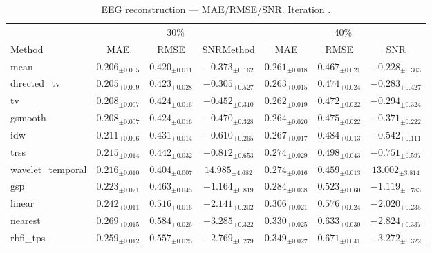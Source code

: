 ﻿%
\begin{table}[ht]
\centering
\caption[EEG reconstruction - Iteration it08]{EEG reconstruction — MAE/RMSE/SNR. Iteration .}
\label{tab:main_it08_high_missing_synthetic}
\small
\begin{tabular}{lcccccc}
\toprule
\multicolumn{1}{c}{} & \multicolumn{3}{c}{30\%} & \multicolumn{3}{c}{40\%} \\
\cmidrule(lr){2-4} \cmidrule(lr){5-7}
Method & MAE & RMSE & SNRMethod & MAE & RMSE & SNR \\
\midrule
mean & $0.206_{\pm 0.005}$ & $0.420_{\pm 0.011}$ & $-0.373_{\pm 0.162}$ & $0.261_{\pm 0.018}$ & $0.467_{\pm 0.021}$ & $-0.228_{\pm 0.303}$ \\
directed\_tv & $0.205_{\pm 0.009}$ & $0.423_{\pm 0.028}$ & $-0.305_{\pm 0.527}$ & $0.263_{\pm 0.015}$ & $0.474_{\pm 0.024}$ & $-0.283_{\pm 0.427}$ \\
tv & $0.208_{\pm 0.007}$ & $0.424_{\pm 0.016}$ & $-0.452_{\pm 0.310}$ & $0.262_{\pm 0.019}$ & $0.472_{\pm 0.022}$ & $-0.294_{\pm 0.324}$ \\
gsmooth & $0.208_{\pm 0.007}$ & $0.424_{\pm 0.016}$ & $-0.470_{\pm 0.328}$ & $0.264_{\pm 0.020}$ & $0.475_{\pm 0.022}$ & $-0.371_{\pm 0.222}$ \\
idw & $0.211_{\pm 0.006}$ & $0.431_{\pm 0.014}$ & $-0.610_{\pm 0.265}$ & $0.267_{\pm 0.017}$ & $0.484_{\pm 0.013}$ & $-0.542_{\pm 0.111}$ \\
trss & $0.215_{\pm 0.014}$ & $0.442_{\pm 0.032}$ & $-0.812_{\pm 0.653}$ & $0.274_{\pm 0.029}$ & $0.498_{\pm 0.043}$ & $-0.751_{\pm 0.597}$ \\
wavelet\_temporal & $0.216_{\pm 0.010}$ & $0.404_{\pm 0.007}$ & $14.985_{\pm 4.682}$ & $0.274_{\pm 0.016}$ & $0.459_{\pm 0.013}$ & $13.002_{\pm 3.814}$ \\
gsp & $0.223_{\pm 0.021}$ & $0.463_{\pm 0.045}$ & $-1.164_{\pm 0.819}$ & $0.284_{\pm 0.038}$ & $0.523_{\pm 0.060}$ & $-1.119_{\pm 0.783}$ \\
linear & $0.242_{\pm 0.011}$ & $0.516_{\pm 0.016}$ & $-2.141_{\pm 0.202}$ & $0.306_{\pm 0.021}$ & $0.576_{\pm 0.024}$ & $-2.020_{\pm 0.235}$ \\
nearest & $0.269_{\pm 0.015}$ & $0.584_{\pm 0.026}$ & $-3.285_{\pm 0.322}$ & $0.330_{\pm 0.025}$ & $0.633_{\pm 0.030}$ & $-2.824_{\pm 0.337}$ \\
rbfi\_tps & $0.259_{\pm 0.012}$ & $0.557_{\pm 0.025}$ & $-2.769_{\pm 0.279}$ & $0.349_{\pm 0.027}$ & $0.671_{\pm 0.041}$ & $-3.272_{\pm 0.322}$ \\

\end{tabular}
\end{table}
